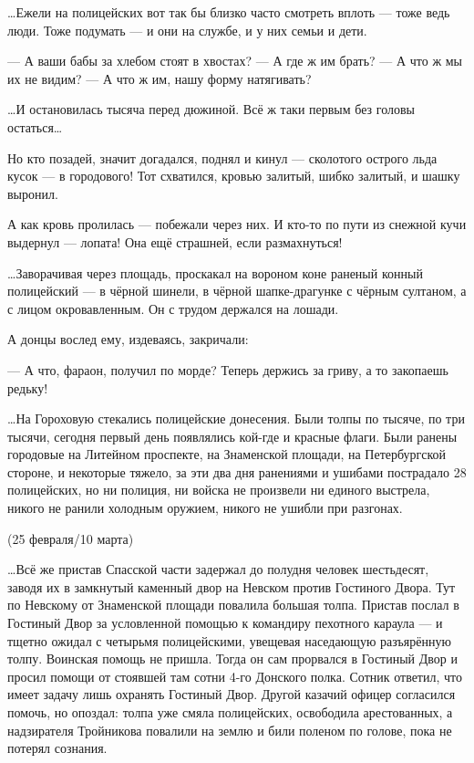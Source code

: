 …Ежели на полицейских вот так бы близко часто смотреть вплоть — тоже ведь люди. Тоже подумать — и они на службе, и у них семьи и дети.

— А ваши бабы за хлебом стоят в хвостах?
— А где ж им брать?
— А что ж мы их не видим?
— А что ж им, нашу форму натягивать?

…И остановилась тысяча перед дюжиной. Всё ж таки первым без головы остаться…

Но кто позадей, значит догадался, поднял и кинул — сколотого острого льда кусок
— в городового! Тот схватился, кровью залитый, шибко залитый, и шашку выронил.

А как кровь пролилась — побежали через них. И кто-то по пути из снежной кучи
выдернул — лопата! Она ещё страшней, если размахнуться!

…Заворачивая через площадь, проскакал на вороном коне раненый конный
полицейский — в чёрной шинели, в чёрной шапке-драгунке с чёрным султаном, а с
лицом окровавленным. Он с трудом держался на лошади.

А донцы вослед ему, издеваясь, закричали:

— А что, фараон, получил по морде? Теперь держись за гриву, а то закопаешь редьку!

…На Гороховую стекались полицейские донесения. Были толпы по тысяче, по три
тысячи, сегодня первый день появлялись кой-где и красные флаги. Были ранены
городовые на Литейном проспекте, на Знаменской площади, на Петербургской
стороне, и некоторые тяжело, за эти два дня ранениями и ушибами пострадало 28
полицейских, но ни полиция, ни войска не произвели ни единого выстрела, никого
не ранили холодным оружием, никого не ушибли при разгонах.

(25 февраля/10 марта)

…Всё же пристав Спасской части задержал до полудня человек шестьдесят, заводя
их в замкнутый каменный двор на Невском против Гостиного Двора. Тут по Невскому
от Знаменской площади повалила большая толпа. Пристав послал в Гостиный Двор за
условленной помощью к командиру пехотного караула — и тщетно ожидал с четырьмя
полицейскими, увещевая наседающую разъярённую толпу. Воинская помощь не пришла.
Тогда он сам прорвался в Гостиный Двор и просил помощи от стоявшей там сотни
4-го Донского полка. Сотник ответил, что имеет задачу лишь охранять Гостиный
Двор. Другой казачий офицер согласился помочь, но опоздал: толпа уже смяла
полицейских, освободила арестованных, а надзирателя Тройникова повалили на
землю и били поленом по голове, пока не потерял сознания.

